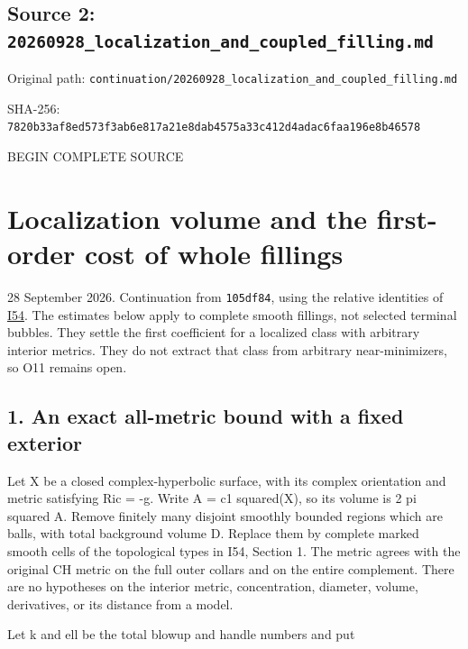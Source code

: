 \documentclass[
  10pt,
]{article}
\begin{document}
\hypertarget{source-2-20260928_localization_and_coupled_filling.md}{%
\subsection{Source 2:
\nolinkurl{20260928_localization_and_coupled_filling.md}}\label{source-2-20260928_localization_and_coupled_filling.md}}

Original path:
\nolinkurl{continuation/20260928_localization_and_coupled_filling.md}

SHA-256:
\nolinkurl{7820b33af8ed573f3ab6e817a21e8dab4575a33c412d4adac6faa196e8b46578}

BEGIN COMPLETE SOURCE

\hypertarget{localization-volume-and-the-first-order-cost-of-whole-fillings}{%
\section{Localization volume and the first-order cost of whole
fillings}\label{localization-volume-and-the-first-order-cost-of-whole-fillings}}

28 September 2026. Continuation from \texttt{105df84}, using the
relative identities of \href{20260928_relative_cell_cost.md}{I54}. The
estimates below apply to complete smooth fillings, not selected terminal
bubbles. They settle the first coefficient for a localized class with
arbitrary interior metrics. They do not extract that class from
arbitrary near-minimizers, so O11 remains open.

\hypertarget{an-exact-all-metric-bound-with-a-fixed-exterior}{%
\subsection{1. An exact all-metric bound with a fixed
exterior}\label{an-exact-all-metric-bound-with-a-fixed-exterior}}

Let X be a closed complex-hyperbolic surface, with its complex
orientation and metric satisfying Ric = -g. Write A = c1 squared(X), so
its volume is 2 pi squared A. Remove finitely many disjoint smoothly
bounded regions which are balls, with total background volume D. Replace
them by complete marked smooth cells of the topological types in I54,
Section 1. The metric agrees with the original CH metric on the full
outer collars and on the entire complement. There are no hypotheses on
the interior metric, concentration, diameter, volume, derivatives, or
its distance from a model.

Let k and ell be the total blowup and handle numbers and put
\end{document}
